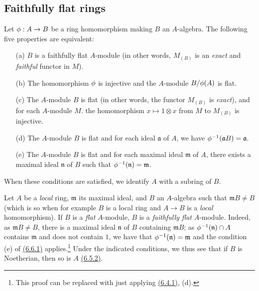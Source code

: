 \subsection{Faithfully flat rings}
\label{subsection-faithfullu-flat-rings}

\begin{env}[6.6.1]
\label{env-0.6.6.1}
Let $\phi:A\to B$ be a ring homomorphism making $B$ an $A$-algebra. The following five
properties are equivalent:
\begin{itemize}
  \item[(a)] $B$ is a faithfully flat $A$-module (in other words, $M_{(B)}$ is an {\em exact}
    and {\em faithful} functor in $M$).
  \item[(b)] The homomorphism $\phi$ is injective and the $A$-module $B/\phi(A)$ is flat.
  \item[(c)] The $A$-module $B$ is flat (in other words, the functor $M_{(B)}$ is {\em exact}),
    and for each $A$-module $M$. the homomorphism $x\mapsto 1\otimes x$ from $M$ to $M_{(B)}$ is
    injective.
  \item[(d)] The $A$-module $B$ is flat and for each ideal $\mathfrak{a}$ of $A$, we have
    $\phi^{-1}(\mathfrak{a}B)=\mathfrak{a}$.
  \item[(e)] The $A$-module $B$ is flat and for each maximal ideal $\mathfrak{m}$ of $A$, there
    exists a maximal ideal $\mathfrak{n}$ of $B$ such that $\phi^{-1}(\mathfrak{n})=\mathfrak{m}$.
\end{itemize}

When these conditions are satisfied, we identify $A$ with a subring of $B$.
\end{env}

\begin{env}[6.6.2]
\label{env-0.6.6.2}
Let $A$ be a {\em local} ring, $\mathfrak{m}$ its maximal ideal, and $B$ an $A$-algebra such
that $\mathfrak{m}B\neq B$ (which is so when for example $B$ is a local ring and $A\to B$ is
a {\em local} homomorphism). If $B$ is a {\em flat} $A$-module, $B$ is a {\em faithfully
flat} $A$-module. Indeed, as $\mathfrak{m}B\neq B$, there is a maximal ideal $\mathfrak{n}$
of $B$ containing $\mathfrak{m}B$; as $\phi^{-1}(\mathfrak{n})\cap A$ contains
$\mathfrak{m}$ and does not contain $1$, we have that $\phi^{-1}(\mathfrak{n})=\mathfrak{m}$
and the condition (e) of \hyperref[env-0.6.6.1]{(6.6.1)} applies.\footnote{This proof can be
replaced with just applying \hyperref[env-0.6.4.1]{(6.4.1)}, (d).} Under the indicated
conditions, we thus see that if $B$ is Noetherian, then so is
$A$ \hyperref[env-0.6.5.2]{(6.5.2)}.
\end{env}

